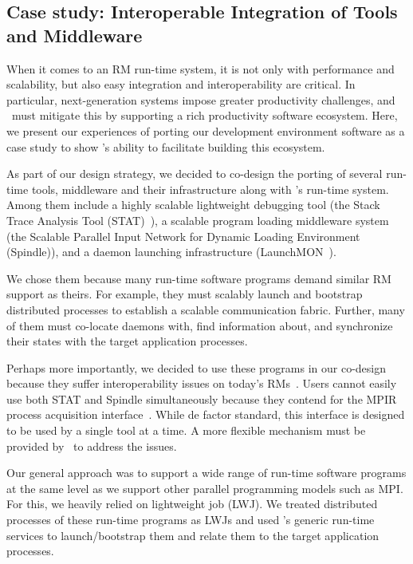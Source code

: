 \subsection{Case study: Interoperable Integration of Tools and Middleware}
\label{case}
When it comes to an RM run-time system, it is 
not only with performance and scalability,
but also easy integration and interoperability are critical.
In particular, next-generation systems impose greater productivity
challenges, and \flux\ must mitigate this by supporting a rich 
productivity software ecosystem. 
Here, we present our experiences of porting our development
environment software as a case study
to show \flux's ability to facilitate building this ecosystem. 

As part of our design strategy, we decided to 
co-design the porting of several run-time tools, middleware 
and their infrastructure along with \flux's run-time system. 
Among them include a highly scalable lightweight debugging tool
(the Stack Trace Analysis Tool (STAT)~\cite{STAT}),
a scalable program loading middleware system (the 
Scalable Parallel Input Network for Dynamic 
Loading Environment ({\sc Spindle})),
and a daemon launching infrastructure (LaunchMON~\cite{launchmon}). 

We chose them because many run-time software
programs demand similar RM support as theirs.
For example, they must scalably launch and bootstrap 
distributed processes to establish a scalable 
communication fabric. 
Further, many of them must co-locate daemons with, 
find information about, and synchronize their states with 
the target application processes.

Perhaps more importantly, we decided to use these programs
in our co-design because they suffer interoperability issues on 
today's RMs~\cite{Jette02slurm,ALPS,BGQRes,Castain05theopen}.
Users cannot easily use both STAT
and {\sc Spindle} simultaneously because they contend for
the MPIR process acquisition interface~\cite{MPIRInterface}.
While de factor standard, this interface is designed 
to be used by a single tool at a time. 
A more flexible mechanism must be provided by \flux\
to address the issues.

Our general approach was to support a wide range of run-time software programs 
at the same level as we support other parallel programming 
models such as MPI. For this, we heavily relied on lightweight 
job (LWJ). We treated 
distributed processes of these run-time programs
as LWJs and used \flux's 
generic run-time services to launch/bootstrap them and 
relate them to the target application processes.

